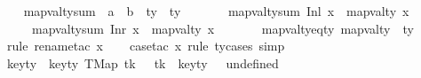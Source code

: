 \begin{isabellebody}
\ \ \isamarkupfalse%
\ mapval{\isacharunderscore}{\kern0pt}ty{\isacharunderscore}{\kern0pt}sum\ {\isacharcolon}{\kern0pt}{\isacharcolon}{\kern0pt}\ {\isachardoublequoteopen}{\isacharprime}{\kern0pt}a\ {\isacharplus}{\kern0pt}\ {\isacharprime}{\kern0pt}b\ {\isasymRightarrow}\ ty\ {\isasymtimes}\ ty{\isachardoublequoteclose}\ \isanewline
\ \ \ \ \ \ {\isachardoublequoteopen}mapval{\isacharunderscore}{\kern0pt}ty{\isacharunderscore}{\kern0pt}sum\ {\isacharparenleft}{\kern0pt}Inl\ x{\isacharparenright}{\kern0pt}\ {\isacharequal}{\kern0pt}\ mapval{\isacharunderscore}{\kern0pt}ty\ x{\isachardoublequoteclose}\isanewline
\ \ \ \ {\isacharbar}{\kern0pt}\ {\isachardoublequoteopen}mapval{\isacharunderscore}{\kern0pt}ty{\isacharunderscore}{\kern0pt}sum\ {\isacharparenleft}{\kern0pt}Inr\ x{\isacharparenright}{\kern0pt}\ {\isacharequal}{\kern0pt}\ mapval{\isacharunderscore}{\kern0pt}ty\ x{\isachardoublequoteclose}\isanewline
\ \ \isamarkupfalse%
%
\isadelimproof
\ %
\endisadelimproof
%
\isatagproof
\isakeywordONE{{\isachardot}{\kern0pt}{\isachardot}{\kern0pt}}\isamarkupfalse%
%
\endisatagproof
{\isafoldproof}%
%
\isadelimproof
%
\endisadelimproof
\ \isamarkupfalse%
\isanewline
\isanewline
{}\isamarkupfalse%
\ mapval{\isacharunderscore}{\kern0pt}ty{\isacharunderscore}{\kern0pt}eq{\isacharunderscore}{\kern0pt}ty{}{}{}{\isacharcolon}{\kern0pt}\ {\isachardoublequoteopen}mapval{\isacharunderscore}{\kern0pt}ty\ {\isacharequal}{\kern0pt}\ ty{}{}{}{\isachardoublequoteclose}\isanewline
%
\isadelimproof
\ \ %
\endisadelimproof
%
\isatagproof
{}\isamarkupfalse%
\ {\isacharparenleft}{\kern0pt}rule{\isacharcomma}{\kern0pt}\ rename{\isacharunderscore}{\kern0pt}tac\ x{\isacharparenright}{\kern0pt}\isanewline
\ \ \isamarkupfalse%
\ {\isacharparenleft}{\kern0pt}case{\isacharunderscore}{\kern0pt}tac\ x\ rule{\isacharcolon}{\kern0pt}\ ty{}{}{}{\isachardot}{\kern0pt}cases{\isacharsemicolon}{\kern0pt}\ simp{\isacharparenright}{\kern0pt}%
\endisatagproof
{\isafoldproof}%
%
\isadelimproof
\isanewline
%
\endisadelimproof
\isanewline
{}\isamarkupfalse%
\ key{\isacharunderscore}{\kern0pt}ty\ \ {\isachardoublequoteopen}key{\isacharunderscore}{\kern0pt}ty\ {\isacharparenleft}{\kern0pt}TMap\ tk\ {\isacharunderscore}{\kern0pt}{\isacharparenright}{\kern0pt}\ {\isacharequal}{\kern0pt}\ tk{\isachardoublequoteclose}\ {\isacharbar}{\kern0pt}\ {\isachardoublequoteopen}key{\isacharunderscore}{\kern0pt}ty\ {\isacharunderscore}{\kern0pt}\ {\isacharequal}{\kern0pt}\ undefined{\isachardoublequoteclose}\isanewline

\end{isabellebody}
